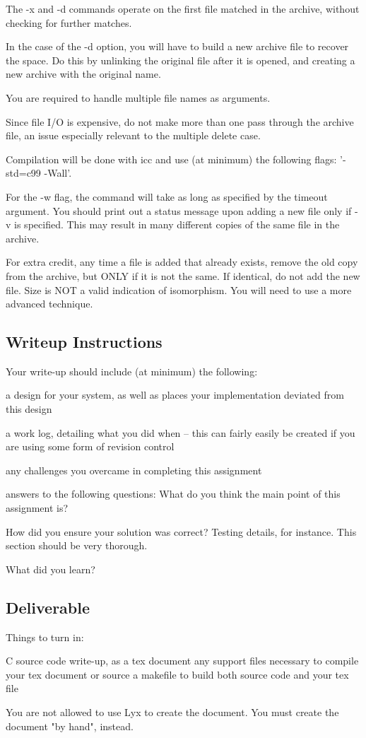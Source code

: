 \documentclass[letterpaper,10pt]{article}
\begin{document}
    The -x and -d commands operate on the first file matched in the archive,
    without checking for further matches.

    In the case of the -d option, you will have to build a new archive file to
    recover the space. Do this by unlinking the original file after it is
    opened, and creating a new archive with the original name.

    You are required to handle multiple file names as arguments.

    Since file I/O is expensive, do not make more than one pass through the
    archive file, an issue especially relevant to the multiple delete case.

    Compilation will be done with icc and use (at minimum) the following flags:
    '-std=c99 -Wall'.

    For the -w flag, the command will take as long as specified by the timeout
    argument. You should print out a status message upon adding a new file only
    if -v is specified. This may result in many different copies of the same
    file in the archive.

    For extra credit, any time a file is added that already exists, remove the
    old copy from the archive, but ONLY if it is not the same. If identical, do
    not add the new file. Size is NOT a valid indication of isomorphism. You
    will need to use a more advanced technique.

\subsection*{Writeup Instructions}

Your write-up should include (at minimum) the following:

    a design for your system, as well as places your implementation deviated
    from this design

    a work log, detailing what you did when -- this can fairly easily be
    created if you are using some form of revision control

    any challenges you overcame in completing this assignment

    answers to the following questions:
        What do you think the main point of this assignment is?

        How did you ensure your solution was correct? Testing details, for
        instance. This section should be very thorough.

        What did you learn?

\subsection*{Deliverable}

Things to turn in:

    C source code
    write-up, as a tex document
    any support files necessary to compile your tex document or source
    a makefile to build both source code and your tex file

You are not allowed to use Lyx to create the document. You must create the
document "by hand", instead.
\end{document}
